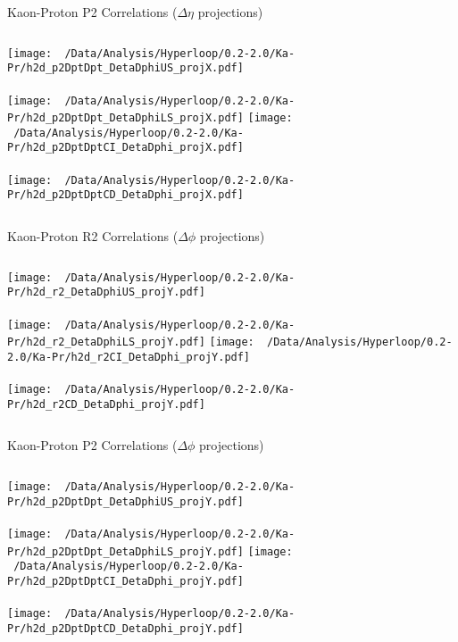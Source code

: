 \documentclass{beamer}
\begin{document}
\begin{frame}{Kaon-Proton P2 Correlations ($\Delta\eta$ projections)}
	\begin{columns}
		\centering
		\texttt{[image: ~/Data/Analysis/Hyperloop/0.2-2.0/Ka-Pr/h2d\_p2DptDpt\_DetaDphiUS\_projX.pdf]}\\~\\
		\texttt{[image: ~/Data/Analysis/Hyperloop/0.2-2.0/Ka-Pr/h2d\_p2DptDpt\_DetaDphiLS\_projX.pdf]}
		\centering
		\texttt{[image: ~/Data/Analysis/Hyperloop/0.2-2.0/Ka-Pr/h2d\_p2DptDptCI\_DetaDphi\_projX.pdf]}\\~\\
		\texttt{[image: ~/Data/Analysis/Hyperloop/0.2-2.0/Ka-Pr/h2d\_p2DptDptCD\_DetaDphi\_projX.pdf]}
	\end{columns}
\end{frame}
\begin{frame}{Kaon-Proton R2 Correlations ($\Delta\phi$ projections)}
	\begin{columns}
		\column{0.5\linewidth}
		\centering
		\texttt{[image: ~/Data/Analysis/Hyperloop/0.2-2.0/Ka-Pr/h2d\_r2\_DetaDphiUS\_projY.pdf]}\\~\\
		\texttt{[image: ~/Data/Analysis/Hyperloop/0.2-2.0/Ka-Pr/h2d\_r2\_DetaDphiLS\_projY.pdf]}
		\column{0.5\linewidth}
		\centering
		\texttt{[image: ~/Data/Analysis/Hyperloop/0.2-2.0/Ka-Pr/h2d\_r2CI\_DetaDphi\_projY.pdf]}\\~\\
		\texttt{[image: ~/Data/Analysis/Hyperloop/0.2-2.0/Ka-Pr/h2d\_r2CD\_DetaDphi\_projY.pdf]}
	\end{columns}
\end{frame}
\begin{frame}{Kaon-Proton P2 Correlations ($\Delta\phi$ projections)}
	\begin{columns}
		\centering
		\texttt{[image: ~/Data/Analysis/Hyperloop/0.2-2.0/Ka-Pr/h2d\_p2DptDpt\_DetaDphiUS\_projY.pdf]}\\~\\
		\texttt{[image: ~/Data/Analysis/Hyperloop/0.2-2.0/Ka-Pr/h2d\_p2DptDpt\_DetaDphiLS\_projY.pdf]}
		\centering
		\texttt{[image: ~/Data/Analysis/Hyperloop/0.2-2.0/Ka-Pr/h2d\_p2DptDptCI\_DetaDphi\_projY.pdf]}\\~\\
		\texttt{[image: ~/Data/Analysis/Hyperloop/0.2-2.0/Ka-Pr/h2d\_p2DptDptCD\_DetaDphi\_projY.pdf]}
	\end{columns}
\end{frame}
\end{document}
